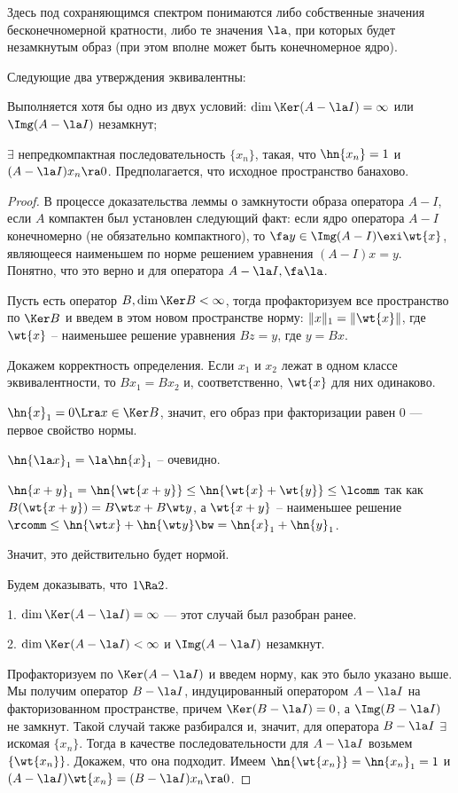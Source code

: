 \documentclass[a4paper]{article}
\begin{document}
Здесь под сохраняющимся спектром понимаются либо собственные значения бесконечномерной кратности,
либо те значения $\la$, при которых будет незамкнутым образ (при этом вполне может быть конечномерное ядро).

\begin{lemma}
Следующие два утверждения эквивалентны:
\begin{nums}{-2}
\item Выполняется хотя бы одно из двух условий:
$\dim\Ker(A-\la I)=\infty$ или $\Img (A-\la I)$ незамкнут;
\item $\exi$ непредкомпактная последовательность $\{x_n\}$, такая, что $\hn{x_n}=1$ и $(A-\la I)x_n\ra 0$.
Предполагается, что исходное пространство банахово.
\end{nums}
\end{lemma}
\begin{proof}
В процессе доказательства леммы о замкнутости образа оператора $A-I$, если $A$ компактен был установлен
следующий факт: если ядро оператора $A-I$ конечномерно (не обязательно компактного), то
$\fa y \in \Img (A-I) \exi \wt{x}$, являющееся наименьшем по норме решением
уравнения $(A-I)x=y$. Понятно, что это верно и для оператора $A-\la I, \fa \la$.

Пусть есть оператор $B,\dim\Ker B<\infty$, тогда профакторизуем все пространство по $\Ker B$ и
введем в этом новом пространстве норму: $\|x\|_1=\|\wt{x}\|$, где $\wt{x}$ --
наименьшее решение уравнения $Bz=y$, где $y=Bx$.

Докажем корректность определения. Если $x_1$ и $x_2$ лежат в одном классе эквивалентности, то
$Bx_1=Bx_2$ и, соответственно, $\wt{x}$ для них одинаково.

$\hn{x}_1=0 \Lra x \in \Ker B$, значит, его образ при факторизации равен $0$ --- первое свойство нормы.

$\hn{\la x}_1=\la \hn{x}_1$ -- очевидно.

$\hn{x+y}_1=\hn{\wt{x+y}} \le \hn{\wt{x}+\wt{y}} \le \lcomm$ так как $B(\wt{x+y})=B\wt x +B\wt y $, а
$\wt{x+y}$ -- наименьшее решение $\rcomm \le \hn{\wt x}+\hn{\wt y} \bw= \hn{x}_1+\hn{y}_1$.

Значит, это действительно будет нормой.

Будем доказывать, что $1\Ra2$.

1. $\dim \Ker(A-\la I)=\infty$ --- этот случай был разобран ранее.

2. $\dim \Ker(A-\la I)<\infty$ и $\Img(A-\la I)$ незамкнут.

Профакторизуем по $\Ker(A-\la I)$ и введем норму, как это было указано выше.  Мы получим оператор
$B-\la I$, индуцированный оператором $A-\la I$ на факторизованном пространстве, причем $\Ker
(B-\la I)=0$, а $\Img(B-\la I)$ не замкнут. Такой случай также разбирался и, значит, для оператора
$B-\la I$ $\exi$ искомая $\{x_n\}$. Тогда в качестве последовательности для $A-\la I$ возьмем
$\{\wt{x_n}\}$. Докажем, что она подходит. Имеем $\hn{\wt{x_n}}=\hn{x_n}_1=1$ и $(A-\la
I)\wt{x_n}=(B-\la I)x_n \ra 0$.


\end{proof}
\end{document}
